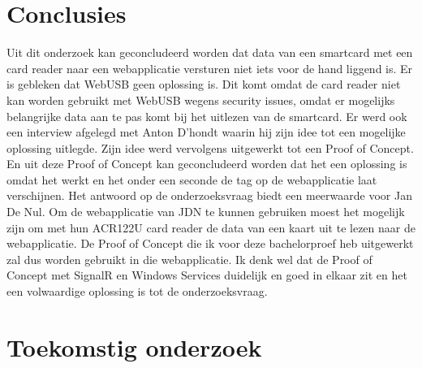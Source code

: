 \documentclass[a0,portrait]{hogent-poster}
\begin{document}
\begin{multicols}{2}




\section{Conclusies}

Uit dit onderzoek kan geconcludeerd worden dat data van een smartcard met een card reader naar een webapplicatie versturen niet iets voor de hand liggend is. Er is gebleken dat WebUSB geen oplossing is. Dit komt omdat de card reader niet kan worden gebruikt met WebUSB wegens security issues, omdat er mogelijks belangrijke data aan te pas komt bij het uitlezen van de smartcard. 
Er werd ook een interview afgelegd met Anton D'hondt waarin hij zijn idee tot een mogelijke oplossing uitlegde. Zijn idee werd vervolgens uitgewerkt tot een Proof of Concept. En uit deze Proof of Concept kan geconcludeerd worden dat het een oplossing is omdat het werkt en het onder een seconde de tag op de webapplicatie laat verschijnen. 
Het antwoord op de onderzoeksvraag biedt een meerwaarde voor Jan De Nul. Om de webapplicatie van JDN te kunnen gebruiken moest het mogelijk zijn om met hun ACR122U card reader de data van een kaart uit te lezen naar de webapplicatie. De Proof of Concept die ik voor deze bachelorproef heb uitgewerkt zal dus worden gebruikt in die webapplicatie. Ik denk wel dat de Proof of Concept met SignalR en Windows Services duidelijk en goed in elkaar zit en het een volwaardige oplossing is tot de onderzoeksvraag.

\section{Toekomstig onderzoek}


\end{multicols}
\end{document}
